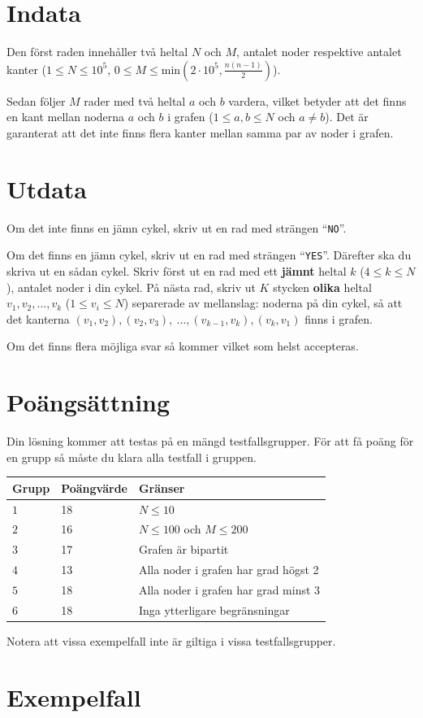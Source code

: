 \section*{Indata}

Den först raden innehåller två heltal $N$ och $M$, antalet noder respektive antalet kanter
($1\le N \le 10^5$, $0\le M \le \mathrm{min}(2\cdot 10^5, \tfrac{n(n-1)}{2})$).

Sedan följer $M$ rader med två heltal $a$ och $b$ vardera, vilket betyder att det finns en kant mellan noderna $a$ och $b$ i grafen ($1\le a, b \le N$ och $a\neq b$). Det är garanterat att det inte finns flera kanter mellan samma par av noder i grafen.

\section*{Utdata}
Om det inte finns en jämn cykel, skriv ut en rad med strängen ``\texttt{NO}''.

Om det finns en jämn cykel, skriv ut en rad med strängen ``\texttt{YES}''. Därefter ska du skriva ut en sådan cykel. Skriv först ut en rad med ett \textbf{jämnt} heltal $k$ ($4\le k \le N$), antalet noder i din cykel. På nästa rad, skriv ut $K$ stycken \textbf{olika} heltal $v_{1}, v_{2}, \ldots, v_{k}$ ($1\le v_{i}\le N$) separerade av mellanslag: noderna på din cykel, så att det kanterna $(v_{1},v_{2}), (v_{2},v_{3}),\ \ldots, (v_{k-1},v_{k}), (v_{k}, v_{1})$ finns i grafen.

Om det finns flera möjliga svar så kommer vilket som helst accepteras.

\section*{Poängsättning}
Din lösning kommer att testas på en mängd testfallsgrupper.
För att få poäng för en grupp så måste du klara alla testfall i gruppen.

\noindent
\begin{tabular}{| l | l | l |}
  \hline
  Grupp & Poängvärde & Gränser \\ \hline \hline
  $1$ & 18 & $N\le 10$
  \\ \hline
  $2$ & 16 & $N\le 100$ och $M\le 200$
  \\ \hline
  $3$  & 17 & Grafen är bipartit
  \\ \hline
  $4$  & 13 & Alla noder i grafen har grad högst 2
  \\ \hline
  $5$  & 18 & Alla noder i grafen har grad minst 3
  \\ \hline
  $6$  & 18 & Inga ytterligare begränsningar
  \\ \hline
\end{tabular}

\noindent Notera att vissa exempelfall inte är giltiga i vissa testfallsgrupper.

\section*{Exempelfall}
